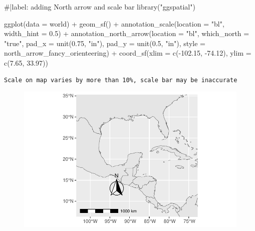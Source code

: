 \documentclass[
  letterpaper,
  DIV=11,
  numbers=noendperiod]{scrartcl}
\newenvironment{Shaded}{\begin{snugshade}}{\end{snugshade}}
\newcommand{\AttributeTok}[1]{\textcolor[rgb]{0.40,0.45,0.13}{#1}}
\newcommand{\CommentTok}[1]{\textcolor[rgb]{0.37,0.37,0.37}{#1}}
\newcommand{\FloatTok}[1]{\textcolor[rgb]{0.68,0.00,0.00}{#1}}
\newcommand{\FunctionTok}[1]{\textcolor[rgb]{0.28,0.35,0.67}{#1}}
\newcommand{\NormalTok}[1]{\textcolor[rgb]{0.00,0.23,0.31}{#1}}
\newcommand{\SpecialCharTok}[1]{\textcolor[rgb]{0.37,0.37,0.37}{#1}}
\newcommand{\StringTok}[1]{\textcolor[rgb]{0.13,0.47,0.30}{#1}}
\begin{document}
\begin{Shaded}
\begin{Highlighting}[]
\CommentTok{\#|label: adding North arrow and scale bar}
\FunctionTok{library}\NormalTok{(}\StringTok{"ggspatial"}\NormalTok{) }

\FunctionTok{ggplot}\NormalTok{(}\AttributeTok{data =}\NormalTok{ world) }\SpecialCharTok{+}     
  \FunctionTok{geom\_sf}\NormalTok{() }\SpecialCharTok{+}     
  \FunctionTok{annotation\_scale}\NormalTok{(}\AttributeTok{location =} \StringTok{"bl"}\NormalTok{, }\AttributeTok{width\_hint =} \FloatTok{0.5}\NormalTok{) }\SpecialCharTok{+}     
  \FunctionTok{annotation\_north\_arrow}\NormalTok{(}\AttributeTok{location =} \StringTok{"bl"}\NormalTok{, }
                         \AttributeTok{which\_north =} \StringTok{"true"}\NormalTok{,          }
                         \AttributeTok{pad\_x =} \FunctionTok{unit}\NormalTok{(}\FloatTok{0.75}\NormalTok{, }\StringTok{"in"}\NormalTok{), }
                         \AttributeTok{pad\_y =} \FunctionTok{unit}\NormalTok{(}\FloatTok{0.5}\NormalTok{, }\StringTok{"in"}\NormalTok{),         }
                         \AttributeTok{style =}\NormalTok{ north\_arrow\_fancy\_orienteering) }\SpecialCharTok{+}     
  \FunctionTok{coord\_sf}\NormalTok{(}\AttributeTok{xlim =} \FunctionTok{c}\NormalTok{(}\SpecialCharTok{{-}}\FloatTok{102.15}\NormalTok{, }\SpecialCharTok{{-}}\FloatTok{74.12}\NormalTok{), }\AttributeTok{ylim =} \FunctionTok{c}\NormalTok{(}\FloatTok{7.65}\NormalTok{, }\FloatTok{33.97}\NormalTok{))  }
\end{Highlighting}
\end{Shaded}

\begin{verbatim}
Scale on map varies by more than 10%, scale bar may be inaccurate
\end{verbatim}

\begin{figure}[H]

{\centering \includegraphics{Introduction-to-mapping_files/figure-pdf/unnamed-chunk-13-1.pdf}

}

\end{figure}
\end{document}
